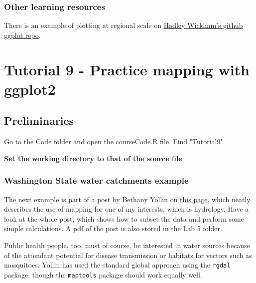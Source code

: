 \documentclass[titlepage]{book}\usepackage{knitr}
\begin{document}
\subsection{ Other learning resources}
There is an example of plotting at regional scale on \href{https://github.com/hadley/ggplot2/wiki/plotting-polygon-shapefiles}{Hadley Wickham's github ggplot repo}.











\chapter{Tutorial 9 - Practice mapping with ggplot2}

\author{Brian Williams $<$\href{mailto:bjw649@gmail.com}%
{bjw649@gmail.com}$>$}


\section{Preliminaries}

Go to the Code folder and open the courseCode.R file.  Find "Tutorial9".

\textbf{Set the working directory to that of the source file}.



\subsection{Washington State water catchments example}

The next example is part of a post by Bethany Yollin on \href{http://mazamascience.com/WorkingWithData/?p=1494}{this page}, which neatly describes the use of mapping for one of my interests, which is hydrology.  Have a look at the whole post, which shows how to subset the data and perform some simple calculations. A pdf of the post is also stored in the Lab 5 folder.

Public health people, too, must of course, be interested in water sources because of the attendant potential for disease transmission or habitats for vectors such as mosquitoes. Yollin has used the standard global approach using the \texttt{rgdal} package, though the \texttt{maptools} package should work equally well. 
\end{document}
